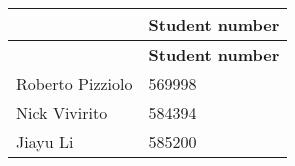 \tabulinesep=1mm
\begin{longtabu} spread 0pt [c]{*2{|X[-1]}|}
\hline
{}&{\bf Student number  }\\
\endfirsthead
\hline
\endfoot
\hline
{}&{\bf Student number  }\\
\endhead
Roberto Pizziolo&569998 \\
Nick Vivirito &584394 \\
Jiayu Li &585200 \\
\end{longtabu}
